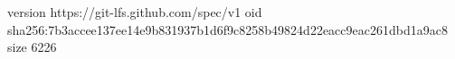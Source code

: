 version https://git-lfs.github.com/spec/v1
oid sha256:7b3accee137ee14e9b831937b1d6f9c8258b49824d22eacc9eac261dbd1a9ac8
size 6226
